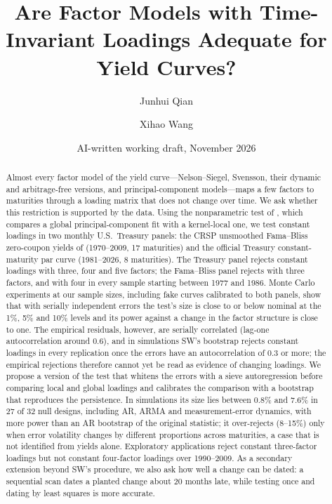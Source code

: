 \documentclass[11pt]{article}
\title{Are Factor Models with Time-Invariant Loadings Adequate for Yield Curves?}
\author{Junhui Qian \and Xihao Wang}
\date{AI-written working draft, November 2026}
\begin{document}
\maketitle

\begin{center}
\end{center}

\begin{abstract}
Almost every factor model of the yield curve---Nelson--Siegel, Svensson, their dynamic and arbitrage-free versions, and principal-component models---maps a few factors to maturities through a loading matrix that does not change over time. We ask whether this restriction is supported by the data. Using the nonparametric test of \citet{SuWang2017}, which compares a global principal-component fit with a kernel-local one, we test constant loadings in two monthly U.S.\ Treasury panels: the CRSP unsmoothed Fama--Bliss zero-coupon yields of \citet{JKV2014} (1970--2009, 17 maturities) and the official Treasury constant-maturity par curve (1981--2026, 8 maturities). The Treasury panel rejects constant loadings with three, four and five factors; the Fama--Bliss panel rejects with three factors, and with four in every sample starting between 1977 and 1986. Monte Carlo experiments at our sample sizes, including fake curves calibrated to both panels, show that with serially independent errors the test's size is close to or below nominal at the 1\%, 5\% and 10\% levels and its power against a change in the factor structure is close to one. The empirical residuals, however, are serially correlated (lag-one autocorrelation around 0.6), and in simulations SW's bootstrap rejects constant loadings in every replication once the errors have an autocorrelation of 0.3 or more; the empirical rejections therefore cannot yet be read as evidence of changing loadings. We propose a version of the test that whitens the errors with a sieve autoregression before comparing local and global loadings and calibrates the comparison with a bootstrap that reproduces the persistence. In simulations its size lies between 0.8\% and 7.6\% in 27 of 32 null designs, including AR, ARMA and measurement-error dynamics, with more power than an AR bootstrap of the original statistic; it over-rejects (8--15\%) only when error volatility changes by different proportions across maturities, a case that is not identified from yields alone. Exploratory applications reject constant three-factor loadings but not constant four-factor loadings over 1990--2009. As a secondary extension beyond SW's procedure, we also ask how well a change can be dated: a sequential scan dates a planted change about 20 months late, while testing once and dating by least squares is more accurate.
\end{abstract}
\end{document}
